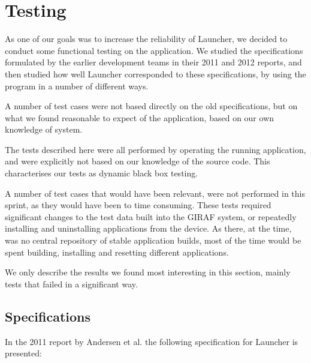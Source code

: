 \section{Testing}
\label{sec:testing_sprint1}
As one of our goals was to increase the reliability of Launcher, we decided to conduct some functional testing on the application.
We studied the specifications formulated by the earlier development teams in their 2011 \cite{launcher2011} and 2012 \cite{launcher2012} reports, and then studied how well Launcher corresponded to these specifications, by using the program in a number of different ways. 

A number of test cases were not based directly on the old specifications, but on what we found reasonable to expect of the application, based on our own knowledge of system.

The tests described here were all performed by operating the running application, and were explicitly not based on our knowledge of the source code. This characterises our tests as dynamic black box testing. 

A number of test cases that would have been relevant, were not performed in this sprint, as they would have been to time consuming. These tests required significant changes to the test data built into the GIRAF system, or repeatedly installing and uninstalling applications from the device. As there, at the time, was no central repository of stable application builds, most of the time would be spent building, installing and resetting different applications.

We only describe the results we found most interesting in this section, mainly tests that failed in a significant way. 

\subsection{Specifications}
In the 2011 report by Andersen et al. \cite{launcher2011} the following specification for Launcher is presented:

